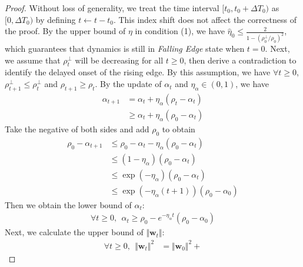 \documentclass[pdflatex,sn-basic]{sn-jnl}%
\theoremstyle{thmstyleone}%
\begin{document}
\begin{appendices}
\begin{proof}
  Without loss of generality, we treat the time interval $[t_0, t_0 + \Delta T_0)$ as $[0, \Delta T_0)$ by defining 
  $t \leftarrow t - t_0$. This index shift does not affect the correctness of the proof. 
  By the upper bound of $\eta$ in condition (1), we have $\hat{\eta}_0 \le \frac{2}{1 - \left({\rho_0^{\perp}}/{\rho_0}\right)^2 }$, 
  which guarantees that dynamics is still in \textit{Falling Edge} state when $t = 0$. 
  Next, we assume that $\rho_t^{\perp}$ will be decreasing for all $t \ge 0$, then derive a contradiction to identify the delayed onset of the rising edge.
  By this assumption, we have $\forall t \ge 0$, $\rho_{t+1}^{\perp} \le \rho_{t}^{\perp}$ and $\rho_{t+1} \ge \rho_{t}$. 
  By the update of $\alpha_{t}$ and $\eta_{\alpha} \in (0, 1)$, we have 
  \begin{equation*}
  \begin{aligned}
    \alpha_{t+1} & = \alpha_{t} + \eta_{\alpha} \left(
      \rho_t - \alpha_{t}
    \right)
    \\ & \ge 
    \alpha_{t} + \eta_{\alpha} \left(
      \rho_0 - \alpha_{t}
    \right)
  \end{aligned}
  \end{equation*}
  Take the negative of both sides and add $\rho_0$ to obtain
  \begin{equation*}
  \begin{aligned}
    \rho_0 - \alpha_{t+1} & \le 
    \rho_0 -\alpha_{t} - \eta_{\alpha} \left(
      \rho_0 - \alpha_{t}
    \right)
    \\ & \le 
    \left(1 - \eta_{\alpha} \right)\left(\rho_0 -\alpha_{t}\right) 
    \\ & \le 
    \exp(-\eta_{\alpha}) \left(\rho_0 -\alpha_{t}\right)
     \\ & \le 
    \exp(-\eta_{\alpha}(t+1)) \left(\rho_0 -\alpha_{0}\right)
  \end{aligned}
  \end{equation*}
  Then we obtain the lower bound of $\alpha_t$:
  \begin{equation*}
  \begin{aligned}
    \forall t \ge 0, \ \ \alpha_t \ge \rho_0 - e^{-\eta_{\alpha}t} \left(\rho_0 -\alpha_{0}\right)
  \end{aligned}
  \end{equation*}
  Next, we calculate the upper bound of $\Vert \mathbf{w}_t \Vert$:
  \begin{equation*}
  \begin{aligned}
    \forall t \ge 0, \ \ \Vert \mathbf{w}_t \Vert^{2} & = \Vert \mathbf{w}_0 \Vert^{2} + 

\end{aligned}
\end{equation*}
\end{proof}
\end{appendices}
\end{document}
